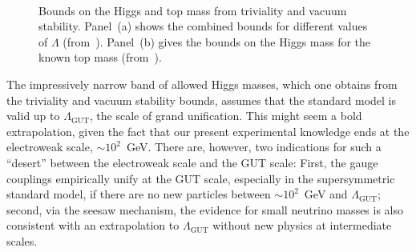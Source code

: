\documentclass[12pt]{report}
\newcommand{\2}{\ensuremath{\sqrt{2}\,}}
\begin{document}
{      \begin{figure}[htbp]
        \begin{center}
          ~
        \end{center}
        \vspace{-.5cm}\caption{\label{fig:trivstab}Bounds on the Higgs and top mass from triviality
          and vacuum stability. Panel~(a) shows the combined bounds for different values of
          $\Lambda$ (from~\cite{Froggatt:2003ef}). Panel~(b) gives the bounds on the Higgs mass for
          the known top mass (from~\cite{Quigg:1999xg}).} 
      \end{figure}

      The impressively narrow band of allowed Higgs masses, which one obtains from the triviality
      and vacuum stability bounds,
      assumes that the standard model is valid up to $\Lambda_\text{GUT}$, the scale of
      grand unification.
      This might seem a bold extrapolation, given the fact that our present experimental 
      knowledge ends at the electroweak scale, $\sim 10^2$~GeV. There are, however, two
      indications for such a ``desert'' between the electroweak scale and the GUT scale:
      First, the gauge couplings empirically unify at the GUT scale, especially in the 
      supersymmetric standard model, if 
      there are no new particles between $\sim 10^2$~GeV and $\Lambda_\text{GUT}$; second,
      via the seesaw mechanism, the evidence for small neutrino masses is also consistent
      with an extrapolation to $\Lambda_\text{GUT}$ without new physics at intermediate scales. 



}
\end{document}
